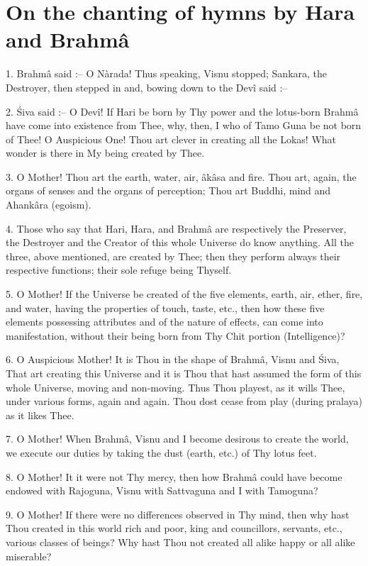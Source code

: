 ﻿\chapter{On the chanting of hymns by Hara and Brahm\^a}

1. Brahm\^a said :-- O Nàrada! Thus speaking, Visnu stopped; Sankara, the Destroyer, then stepped in and, bowing down to the Dev\^i said :--

2. \'Siva said :-- O Dev\^i! If Hari be born by Thy power and the lotus-born Brahm\^a have come into existence from Thee, why, then, I who of Tamo Guna be not born of Thee! O Auspicious One! Thou art clever in creating all the Lokas! What wonder is there in My being created by Thee.

3. O Mother! Thou art the earth, water, air, \^ak\^asa and fire. Thou art, again, the organs of senses and the organs of perception; Thou art Buddhi, mind and Ahank\^ara (egoism).

4. Those who say that Hari, Hara, and Brahm\^a are respectively the Preserver, the Destroyer and the Creator of this whole Universe do know anything. All the three, above mentioned, are created by Thee; then they perform always their respective functions; their sole refuge being Thyself.

5. O Mother! If the Universe be created of the five elements, earth, air, ether, fire, and water, having the properties of touch, taste, etc., then how these five elements possessing attributes and of the nature of effects, can come into manifestation, without their being born from Thy Chit portion (Intelligence)?

6. O Auspicious Mother! It is Thou in the shape of Brahm\^a, Visnu and \'Siva, That art creating this Universe and it is Thou that hast assumed the form of this whole Universe, moving and non-moving. Thus Thou playest, as it wills Thee, under various forms, again and again. Thou dost cease from play (during pralaya) as it likes Thee.

7. O Mother! When Brahm\^a, Visnu and I become desirous to create the world, we execute our duties by taking the dust (earth, etc.) of Thy lotus feet.

8. O Mother! It it were not Thy mercy, then how Brahm\^a could have become endowed with Rajoguna, Visnu with Sattvaguna and I with Tamoguna?

9. O Mother! If there were no differences observed in Thy mind, then why hast Thou created in this world rich and poor, king and councillors, servants, etc., various classes of beings? Why hast Thou not created all alike happy or all alike miserable?

